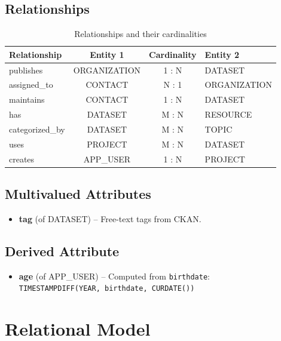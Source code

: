 \documentclass[12pt,a4paper]{article}
\begin{document}
\subsection{Relationships}

\begin{table}[H]
\centering
\begin{tabular}{@{}lccl@{}}
\toprule
\textbf{Relationship} & \textbf{Entity 1} & \textbf{Cardinality} & \textbf{Entity 2} \\
\midrule
publishes   & ORGANIZATION & 1 : N & DATASET \\
assigned\_to  & CONTACT      & N : 1 & ORGANIZATION \\
maintains   & CONTACT      & 1 : N & DATASET \\
has         & DATASET      & M : N & RESOURCE \\
categorized\_by & DATASET & M : N & TOPIC \\
uses        & PROJECT      & M : N & DATASET \\
creates     & APP\_USER   & 1 : N & PROJECT \\
\bottomrule
\end{tabular}
\caption{Relationships and their cardinalities}
\label{tab:rels}
\end{table}

\subsection{Multivalued Attributes}
\begin{itemize}
  \item \textbf{tag} (of DATASET) -- Free-text tags from CKAN.
\end{itemize}

\subsection{Derived Attribute}
\begin{itemize}
  \item \textbf{age} (of APP\_USER) -- Computed from \texttt{birthdate}:\\
        \texttt{TIMESTAMPDIFF(YEAR, birthdate, CURDATE())}
\end{itemize}

\newpage
\section{Relational Model}
\end{document}
